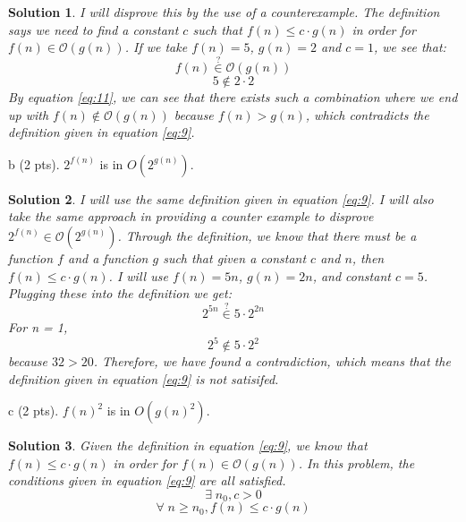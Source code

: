 \documentclass[11pt]{article}
\newtheorem*{solution}{Solution}
\begin{document}
\begin{enumerate}
\begin{solution}
	I will disprove this by the use of a counterexample. The definition says we need to find a constant $c$ such that $f(n) \leq c \cdot g(n)$ in order for $f(n) \in \mathcal{O}(g(n))$. If we take $f(n) = 5$, $g(n) = 2$ and $c = 1$, we see that: \begin{equation}\label{eq:10} f(n) \stackrel{?}{\in} \mathcal{O}(g(n))\end{equation} \begin{equation}\label{eq:11} 5 \notin 2 \cdot 2 \end{equation} 
	By equation \ref{eq:11}, we can see that there exists such a combination where we end up with $f(n) \notin \mathcal{O}(g(n))$ because $f(n) > g(n)$, which contradicts the definition given in equation \ref{eq:9}.
\end{solution}
\newpage
b (2 pts). $2^{f(n)}$ is in $O( 2^{g(n)} )$. 
\begin{solution}
	\item
	I will use the same definition given in equation \ref{eq:9}. I will also take the same approach in providing a counter example
	to disprove $2^{f(n)} \in \mathcal{O}(2^{g(n)})$. Through the definition, we know that there must be a function $f$ and a function $g$
	such that given a constant $c$ and $n$, then $f(n) \leq c \cdot g(n)$. I will use $f(n) = 5n$, $g(n) = 2n$, and constant $c=5$. 
	Plugging these into the definition we get: 
	\begin{equation}\label{eq:12}
		2^{5n} \stackrel{?}{\in} 5 \cdot 2^{2n}
	\end{equation}
	For n = 1,
	\begin{equation}\label{eq:13}
		2^{5} \notin 5 \cdot 2^{2}
	\end{equation}
	because $32 > 20$. Therefore, we have found a contradiction, which means that the definition given in equation \ref{eq:9} is not satisifed. 
\end{solution}
\newpage
c (2 pts). $f(n)^2$ is in $O(g(n)^2)$.
\begin{solution}
	\item 
	Given the definition in equation \ref{eq:9}, we know that $f(n) \leq c \cdot g(n)$ in order for $f(n) \in \mathcal{O}(g(n))$.
	In this problem, the conditions given in equation \ref{eq:9} are all satisfied. \\
	\begin{equation*}\exists\;n_0, c > 0\end{equation*}
	\begin{equation*}\forall\;n \geq n_0, f(n) \leq c \cdot g(n)\end{equation*}

\end{solution}
\end{enumerate}
\end{document}
